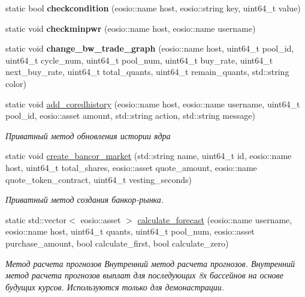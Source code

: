 \begin{DoxyCompactItemize}
static bool {\bfseries checkcondition} (eosio\+::name host, eosio\+::string key, uint64\+\_\+t value)
\item 
\mbox{\label{classunicore_acdb13b5d90405d5626709be7f8a6152b}} 
static void {\bfseries checkminpwr} (eosio\+::name host, eosio\+::name username)
\item 
\mbox{\label{classunicore_a62e5a50f666b6406f7a786646091f529}} 
static void {\bfseries change\+\_\+bw\+\_\+trade\+\_\+graph} (eosio\+::name host, uint64\+\_\+t pool\+\_\+id, uint64\+\_\+t cycle\+\_\+num, uint64\+\_\+t pool\+\_\+num, uint64\+\_\+t buy\+\_\+rate, uint64\+\_\+t next\+\_\+buy\+\_\+rate, uint64\+\_\+t total\+\_\+quants, uint64\+\_\+t remain\+\_\+quants, std\+::string color)
\item 
\mbox{\label{classunicore_a666299956a0903dec8e26b1c5b9b24a9}} 
static void \mbox{\hyperlink{classunicore_a666299956a0903dec8e26b1c5b9b24a9}{add\+\_\+coredhistory}} (eosio\+::name host, eosio\+::name username, uint64\+\_\+t pool\+\_\+id, eosio\+::asset amount, std\+::string action, std\+::string message)
\begin{DoxyCompactList}\small\item\em Приватный метод обновления истории ядра \end{DoxyCompactList}\item 
static void \mbox{\hyperlink{classunicore_a0ea88fc9a5ee27ea75a85e6b842aeba6}{create\+\_\+bancor\+\_\+market}} (std\+::string name, uint64\+\_\+t id, eosio\+::name host, uint64\+\_\+t total\+\_\+shares, eosio\+::asset quote\+\_\+amount, eosio\+::name quote\+\_\+token\+\_\+contract, uint64\+\_\+t vesting\+\_\+seconds)
\begin{DoxyCompactList}\small\item\em Приватный метод создания банкор-\/рынка. \end{DoxyCompactList}\item 
static std\+::vector$<$ eosio\+::asset $>$ \mbox{\hyperlink{classunicore_af3856ac90d470eddfd5dec3f29cb0dc7}{calculate\+\_\+forecast}} (eosio\+::name username, eosio\+::name host, uint64\+\_\+t quants, uint64\+\_\+t pool\+\_\+num, eosio\+::asset purchase\+\_\+amount, bool calculate\+\_\+first, bool calculate\+\_\+zero)
\begin{DoxyCompactList}\small\item\em Метод расчета прогнозов Внутренний метод расчета прогнозов. Внутренний метод расчета прогнозов выплат для последующих 8х бассейнов на основе будущих курсов. Используются только для демонастрации. \end{DoxyCompactList}\item 

\end{DoxyCompactItemize}
